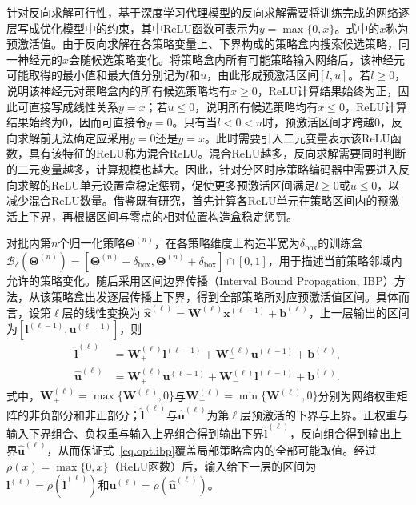 针对反向求解可行性，基于深度学习代理模型的反向求解需要将训练完成的网络逐层写成优化模型中的约束，其中ReLU函数可表示为$y=\max\{0,x\}$。式中的$x$称为预激活值。由于反向求解在各策略变量上、下界构成的策略盒内搜索候选策略，同一神经元的$x$会随候选策略变化。将策略盒内所有可能策略输入网络后，该神经元可能取得的最小值和最大值分别记为$l$和$u$，由此形成预激活区间$[l,u]$。若$l\geq0$，说明该神经元对策略盒内的所有候选策略均有$x\geq0$，ReLU计算结果始终为正，因此可直接写成线性关系$y=x$；若$u\leq0$，说明所有候选策略均有$x\leq0$，ReLU计算结果始终为0，因而可直接令$y=0$。只有当$l<0<u$时，预激活区间才跨越0，反向求解前无法确定应采用$y=0$还是$y=x$。此时需要引入二元变量表示该ReLU函数\citep{tjengEVALUATINGROBUSTNESSNEURAL2019}，具有该特征的ReLU称为混合ReLU。混合ReLU越多，反向求解需要同时判断的二元变量越多，计算规模也越大。因此，针对分区时序策略编码器中需要进入反向求解的ReLU单元设置盒稳定惩罚，促使更多预激活区间满足$l\geq0$或$u\leq0$，以减少混合ReLU数量。借鉴既有研究\citep{xiaoTrainingFasterAdversarial2019,gowalScalableVerifiedTraining2019,tjengEVALUATINGROBUSTNESSNEURAL2019}，首先计算各ReLU单元在策略区间内的预激活上下界，再根据区间与零点的相对位置构造盒稳定惩罚。

对批内第$n$个归一化策略$\bm{\Theta}^{(n)}$，在各策略维度上构造半宽为$\delta_{\mathrm{box}}$的训练盒
$\mathcal{B}_{\delta}(\bm{\Theta}^{(n)})
=[\bm{\Theta}^{(n)}-\delta_{\mathrm{box}},\bm{\Theta}^{(n)}+\delta_{\mathrm{box}}]\cap[0,1]$，用于描述当前策略邻域内允许的策略变化。随后采用区间边界传播（Interval Bound Propagation, IBP）方法\citep{gowalScalableVerifiedTraining2019}，从该策略盒出发逐层传播上下界，得到全部策略所对应预激活值区间。具体而言，设第$\ell$层的线性变换为
$\hat{\bm{x}}^{(\ell)}
=\bm{W}^{(\ell)}\bm{x}^{(\ell-1)}+\bm{b}^{(\ell)}$，上一层输出的区间为$[\bm{l}^{(\ell-1)},\bm{u}^{(\ell-1)}]$，则
\begin{equation}
\begin{aligned}
\hat{\bm{l}}^{(\ell)}
&=\bm{W}_{+}^{(\ell)}\bm{l}^{(\ell-1)}
+\bm{W}_{-}^{(\ell)}\bm{u}^{(\ell-1)}
+\bm{b}^{(\ell)},\\
\hat{\bm{u}}^{(\ell)}
&=\bm{W}_{+}^{(\ell)}\bm{u}^{(\ell-1)}
+\bm{W}_{-}^{(\ell)}\bm{l}^{(\ell-1)}
+\bm{b}^{(\ell)}.
\end{aligned}
\label{eq.opt.ibp}
\end{equation}
式中，$\bm{W}_{+}^{(\ell)}=\max\{\bm{W}^{(\ell)},0\}$与$\bm{W}_{-}^{(\ell)}=\min\{\bm{W}^{(\ell)},0\}$分别为网络权重矩阵的非负部分和非正部分；$\hat{\bm{l}}^{(\ell)}$与$\hat{\bm{u}}^{(\ell)}$为第$\ell$层预激活的下界与上界。正权重与输入下界组合、负权重与输入上界组合得到输出下界$\hat{\bm{l}}^{(\ell)}$，反向组合得到输出上界$\hat{\bm{u}}^{(\ell)}$，从而保证式~\eqref{eq.opt.ibp}覆盖局部策略盒内的全部可能取值。经过\(\rho(x)=\max\{0,x\}\)（ReLU函数）后，输入给下一层的区间为
$\bm{l}^{(\ell)}=\rho(\hat{\bm{l}}^{(\ell)})$和$\bm{u}^{(\ell)}=\rho(\hat{\bm{u}}^{(\ell)})$。

